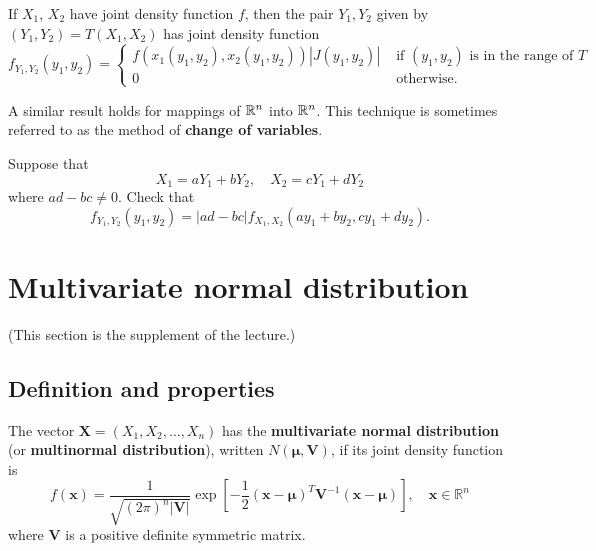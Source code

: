 \begin{corollary}
If $X_1$, $X_2$ have joint density function $f$, then the pair $Y_1,Y_2$ given by $(Y_1 , Y_2) = T (X_1, X_2)$ has joint density function 
\begin{equation*}
    f_{Y_{1}, Y_{2}}\left(y_{1}, y_{2}\right)=\left\{\begin{array}{ll}{f\left(x_{1}\left(y_{1}, y_{2}\right), x_{2}\left(y_{1}, y_{2}\right)\right)\left|J\left(y_{1}, y_{2}\right)\right|} & {\text { if }\left(y_{1}, y_{2}\right) \text { is in the range of } T} \\ {0} & {\text { otherwise. }}\end{array}\right.
\end{equation*}
\end{corollary}

A similar result holds for mappings of $\mathbb{R}^n$ into $\mathbb{R}^n$. This technique is sometimes referred to as the method of \textbf{change of variables}. 

\begin{example}
Suppose that 
\begin{equation*}
    X_{1}=a Y_{1}+b Y_{2}, \quad X_{2}=c Y_{1}+d Y_{2}
\end{equation*}
where $ad-bc \neq 0$. Check that 
\begin{equation*}
    f_{Y_{1}, Y_{2}}\left(y_{1}, y_{2}\right) = |a d-b c| f_{X_{1}, X_{2}}\left(a y_{1}+b y_{2}, c y_{1}+d y_{2}\right).
\end{equation*}
\end{example}


\section{Multivariate normal distribution}
(This section is the supplement of the lecture.)
\subsection{Definition and properties}
\begin{definition}
The vector $\mathbf{X} = (X_1 , X_2 , \dots , X_n )$ has the \textbf{multivariate normal distribution} (or \textbf{multinormal distribution}), written $N(\boldsymbol{\mu}, \mathbf{V})$, if its joint density function is 
\begin{equation*}
    f(\mathbf{x})=\frac{1}{\sqrt{(2 \pi)^{n}|\mathbf{V}|}} \exp \left[-\frac{1}{2}(\mathbf{x}-\boldsymbol{\mu})^T \mathbf{V}^{-1}(\mathbf{x}-\boldsymbol{\mu}) \right], \quad \mathbf{x} \in \mathbb{R}^{n}
\end{equation*}
where $\mathbf{V}$ is a positive definite symmetric matrix. 
\end{definition}

